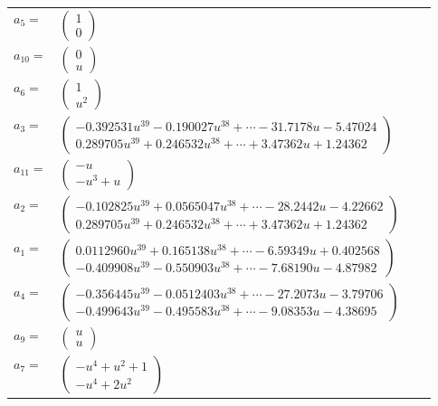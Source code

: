 \documentclass[1p]{elsarticle_modified}
\theoremstyle{definition}
\begin{document}
\begin{tabular}{m{7pt} m{180pt} m{7pt} m{180pt} }
\flushright $a_{5}=$&$\begin{pmatrix}1\\0\end{pmatrix}$ \\
\flushright $a_{10}=$&$\begin{pmatrix}0\\u\end{pmatrix}$ \\
\flushright $a_{6}=$&$\begin{pmatrix}1\\u^2\end{pmatrix}$ \\
\flushright $a_{3}=$&$\begin{pmatrix}-0.392531 u^{39}-0.190027 u^{38}+\cdots-31.7178 u-5.47024\\0.289705 u^{39}+0.246532 u^{38}+\cdots+3.47362 u+1.24362\end{pmatrix}$ \\
\flushright $a_{11}=$&$\begin{pmatrix}- u\\- u^3+u\end{pmatrix}$ \\
\flushright $a_{2}=$&$\begin{pmatrix}-0.102825 u^{39}+0.0565047 u^{38}+\cdots-28.2442 u-4.22662\\0.289705 u^{39}+0.246532 u^{38}+\cdots+3.47362 u+1.24362\end{pmatrix}$ \\
\flushright $a_{1}=$&$\begin{pmatrix}0.0112960 u^{39}+0.165138 u^{38}+\cdots-6.59349 u+0.402568\\-0.409908 u^{39}-0.550903 u^{38}+\cdots-7.68190 u-4.87982\end{pmatrix}$ \\
\flushright $a_{4}=$&$\begin{pmatrix}-0.356445 u^{39}-0.0512403 u^{38}+\cdots-27.2073 u-3.79706\\-0.499643 u^{39}-0.495583 u^{38}+\cdots-9.08353 u-4.38695\end{pmatrix}$ \\
\flushright $a_{9}=$&$\begin{pmatrix}u\\u\end{pmatrix}$ \\
\flushright $a_{7}=$&$\begin{pmatrix}- u^4+u^2+1\\- u^4+2 u^2\end{pmatrix}$ \\

\end{tabular}
\end{document}
